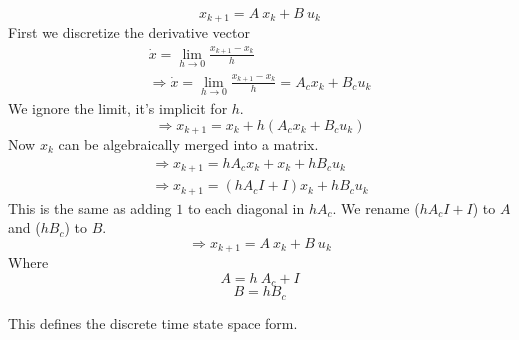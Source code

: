 \begin{equation}
	x_{k+1} = A\ x_k + B\ u_k
\end{equation}
First we discretize the derivative vector
\begin{subequations}
\begin{align}
{\dot{x}} = \lim_{h\rightarrow 0} \frac{{x}_{k+1}-{x}_{k}}{h} \\
\Rightarrow {\dot{x}} = \lim_{h\rightarrow 0} \frac{{x}_{k+1}-{x}_{k}}{h} = {A_c} {x}_k + {B_c} u_k
\end{align}
\end{subequations}
We ignore the limit, it's implicit for $ h $.
\begin{equation}
\Rightarrow {x}_{k+1} = {x}_{k} + h({A_c} {x}_k + {B_c} u_k)
\end{equation}
Now $ {x}_k $ can be algebraically merged into a matrix.
\begin{subequations}
\begin{align}
\Rightarrow {x}_{k+1} = h{A_c} {x}_k + {x}_{k} + h{B_c} u_k \\
\Rightarrow {x}_{k+1} = (h{A_c} {I} + {I}){x}_k + h{B_c} u_k
\end{align}
\end{subequations}
This is the same as adding $ 1 $ to each diagonal in $ h{A_c} $. We rename ($hA_c{I} + {I}$) to $ {A}$ and ($h{B_c}$) to $B$.
\begin{equation} \label{mat:eq}
\Rightarrow {x}_{k+1} = {A}\ {x}_k + {B}\ u_k
\end{equation}
Where
\begin{equation}
{A} = h\ {A_c} + {I}
\end{equation}
\begin{equation}
{B} = h{B_c}
\end{equation}

This defines the discrete time state space form.


